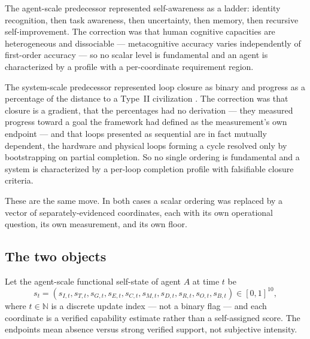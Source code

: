 \documentclass[11pt]{article}
\begin{document}
The agent-scale predecessor represented self-awareness as a ladder: identity recognition, then task awareness, then uncertainty, then memory, then recursive self-improvement. The correction was that human cognitive capacities are heterogeneous and dissociable --- metacognitive accuracy varies independently of first-order accuracy \citep{fleming2010introspective,fleming2012neural} --- so no scalar level is fundamental and an agent is characterized by a profile with a per-coordinate requirement region.

The system-scale predecessor represented loop closure as binary and progress as a percentage of the distance to a Type~II civilization \citep{kardashev1964transmission,dyson1960search}. The correction was that closure is a gradient, that the percentages had no derivation --- they measured progress toward a goal the framework had defined as the measurement's own endpoint --- and that loops presented as sequential are in fact mutually dependent, the hardware and physical loops forming a cycle resolved only by bootstrapping on partial completion. So no single ordering is fundamental and a system is characterized by a per-loop completion profile with falsifiable closure criteria.

These are the same move. In both cases a scalar ordering was replaced by a vector of separately-evidenced coordinates, each with its own operational question, its own measurement, and its own floor.

\subsection{The two objects}
Let the agent-scale functional self-state of agent $A$ at time $t$ be
\begin{equation}
s_t = (s_{I,t}, s_{T,t}, s_{G,t}, s_{E,t}, s_{C,t}, s_{M,t}, s_{D,t}, s_{R,t}, s_{O,t}, s_{B,t}) \in [0,1]^{10},
\label{eq:selfstate}
\end{equation}
where $t\in\mathbb{N}$ is a discrete update index --- not a binary flag --- and each coordinate is a verified capability estimate rather than a self-assigned score. The endpoints mean absence versus strong verified support, not subjective intensity.
\end{document}
